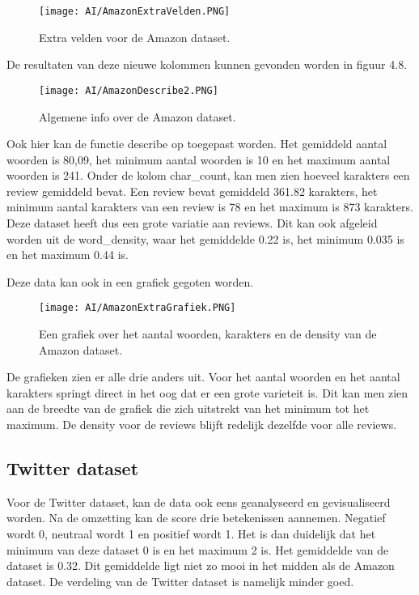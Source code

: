 \begin{figure}[!htbp]
    \texttt{[image: AI/AmazonExtraVelden.PNG]}
    \caption{\label{amazonaantalwoorden}Extra velden voor de Amazon dataset.}
\end{figure}
\FloatBarrier

De resultaten van deze nieuwe kolommen kunnen gevonden worden in figuur 4.8.

\begin{figure}[!htbp]
    \texttt{[image: AI/AmazonDescribe2.PNG]}
    \caption{\label{amazondescribe2}Algemene info over de Amazon dataset.}
\end{figure}
\FloatBarrier

Ook hier kan de functie describe op toegepast worden. Het gemiddeld aantal woorden is 80,09, het minimum aantal woorden is 10 en het maximum aantal woorden is 241. Onder de kolom char\_count, kan men zien hoeveel karakters een review gemiddeld bevat. Een review bevat gemiddeld 361.82 karakters, het minimum aantal karakters van een review is 78 en het maximum is 873 karakters. Deze dataset heeft dus een grote variatie aan reviews. Dit kan ook afgeleid worden uit de word\_density, waar het gemiddelde 0.22 is, het minimum 0.035 is en het maximum 0.44 is.

Deze data kan ook in een grafiek gegoten worden.

\begin{figure}[!htbp]
    \texttt{[image: AI/AmazonExtraGrafiek.PNG]}
    \caption{\label{amazongrafiek}Een grafiek over het aantal woorden, karakters en de density van de Amazon dataset.}
\end{figure}
\FloatBarrier


De grafieken zien er alle drie anders uit. Voor het aantal woorden en het aantal karakters springt direct in het oog dat er een grote varieteit is. Dit kan men zien aan de breedte van de grafiek die zich uitstrekt van het minimum tot het maximum. De density voor de reviews blijft redelijk dezelfde voor alle reviews. 


\subsection{Twitter dataset}
Voor de Twitter dataset, kan de data ook eens geanalyseerd en gevisualiseerd worden. Na de omzetting kan de score drie betekenissen aannemen. Negatief wordt 0, neutraal wordt 1 en positief wordt 1. Het is dan duidelijk dat het minimum van deze dataset 0 is en het maximum 2 is. Het gemiddelde van de dataset is 0.32. Dit gemiddelde ligt niet zo mooi in het midden als de Amazon dataset. De verdeling van de Twitter dataset is namelijk minder goed. 

